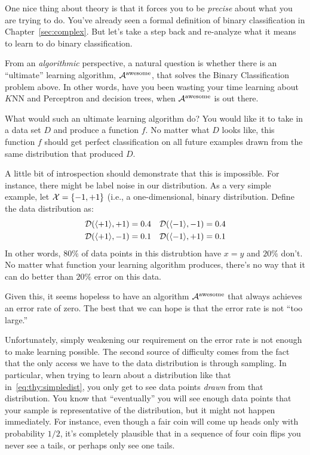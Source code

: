 One nice thing about theory is that it forces you to be \emph{precise}
about what you are trying to do.  You've already seen a formal
definition of binary classification in Chapter~\ref{sec:complex}.  But
let's take a step back and re-analyze what it means to learn to do
binary classification.

From an \emph{algorithmic} perspective, a natural question is whether
there is an ``ultimate'' learning algorithm, $\mathcal{A}^{\text{awesome}}$,
that solves the Binary Classification problem above.  In other words,
have you been wasting your time learning about $K$NN and Perceptron
and decision trees, when $\mathcal{A}^{\text{awesome}}$ is out there.

What would such an ultimate learning algorithm do?  You would like it
to take in a data set $D$ and produce a function $f$.  No matter what
$D$ looks like, this function $f$ should get perfect classification on
all future examples drawn from the same distribution that produced
$D$.

A little bit of introspection should demonstrate that this is
impossible.  For instance, there might be label noise in our
distribution.  As a very simple example, let $\mathcal{X} = \{-1,+1\}$ (i.e.,
a one-dimensional, binary distribution.  Define the data distribution
as:
\begin{align}  \label{eq:thy:simpledist}
\mathcal{D}( \langle +1 \rangle , +1 ) &= 0.4 &
\mathcal{D}( \langle -1 \rangle , -1 ) &= 0.4 \\
\mathcal{D}( \langle +1 \rangle , -1 ) &= 0.1 &
\mathcal{D}( \langle -1 \rangle , +1 ) &= 0.1
\end{align}
In other words, $80\%$ of data points in this distrubtion have $x = y$
and $20\%$ don't.  No matter what function your learning algorithm
produces, there's no way that it can do better than $20\%$ error on
this data.


Given this, it seems hopeless to have an algorithm
$\mathcal{A}^{\text{awesome}}$ that always achieves an error rate of zero.
The best that we can hope is that the error rate is not ``too large.''

Unfortunately, simply weakening our requirement on the error rate is
not enough to make learning possible.  The second source of difficulty
comes from the fact that the only access we have to the data
distribution is through sampling.  In particular, when trying to learn
about a distribution like that in~\ref{eq:thy:simpledist}, you only get
to see data points \emph{drawn} from that distribution.  You know that
``eventually'' you will see enough data points that your sample is
representative of the distribution, but it might not happen
immediately.  For instance, even though a fair coin will come up heads
only with probability $1/2$, it's completely plausible that in a
sequence of four coin flips you never see a tails, or perhaps only see
one tails.

